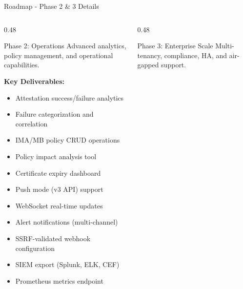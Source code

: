 \begin{frame}{Roadmap - Phase 2 \& 3 Details}
  \begin{columns}[T]
    \begin{column}{0.48\textwidth}
      \begin{block}{Phase 2: Operations}
        \scriptsize
        Advanced analytics, policy management, and operational capabilities.
      \end{block}

      \vspace{0.1cm}
      \scriptsize

      \textbf{Key Deliverables:}
      \begin{itemize}
        \setlength{\itemsep}{0pt}
        \item Attestation success/failure analytics
        \item Failure categorization and correlation
        \item IMA/MB policy CRUD operations
        \item Policy impact analysis tool
        \item Certificate expiry dashboard
        \item Push mode (v3 API) support
        \item WebSocket real-time updates
        \item Alert notifications (multi-channel)
        \item SSRF-validated webhook configuration
        \item SIEM export (Splunk, ELK, CEF)
        \item Prometheus metrics endpoint
      \end{itemize}
    \end{column}
    \begin{column}{0.48\textwidth}
      \begin{block}{Phase 3: Enterprise Scale}
        \scriptsize
        Multi-tenancy, compliance, HA, and air-gapped support.
      \end{block}

      \vspace{0.1cm}
      \scriptsize


\end{column}
\end{columns}
\end{frame}
